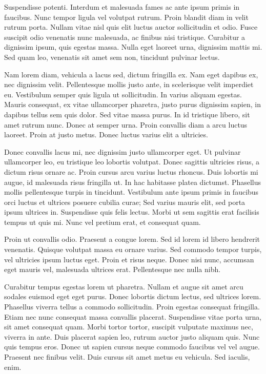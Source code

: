 \documentclass{article}
\begin{document}
Suspendisse potenti. Interdum et malesuada fames ac ante ipsum primis in faucibus. Nunc tempor ligula vel volutpat rutrum. Proin blandit diam in velit rutrum porta. Nullam vitae nisl quis elit luctus auctor sollicitudin et odio. Fusce suscipit odio venenatis nunc malesuada, ac finibus nisi tristique. Curabitur a dignissim ipsum, quis egestas massa. Nulla eget laoreet urna, dignissim mattis mi. Sed quam leo, venenatis sit amet sem non, tincidunt pulvinar lectus.

Nam lorem diam, vehicula a lacus sed, dictum fringilla ex. Nam eget dapibus ex, nec dignissim velit. Pellentesque mollis justo ante, in scelerisque velit imperdiet eu. Vestibulum semper quis ligula ut sollicitudin. In varius aliquam egestas. Mauris consequat, ex vitae ullamcorper pharetra, justo purus dignissim sapien, in dapibus tellus sem quis dolor. Sed vitae massa purus. In id tristique libero, sit amet rutrum nunc. Donec at semper urna. Proin convallis diam a arcu luctus laoreet. Proin at justo metus. Donec luctus varius elit a ultricies.

Donec convallis lacus mi, nec dignissim justo ullamcorper eget. Ut pulvinar ullamcorper leo, eu tristique leo lobortis volutpat. Donec sagittis ultricies risus, a dictum risus ornare ac. Proin cursus arcu varius luctus rhoncus. Duis lobortis mi augue, id malesuada risus fringilla ut. In hac habitasse platea dictumst. Phasellus mollis pellentesque turpis in tincidunt. Vestibulum ante ipsum primis in faucibus orci luctus et ultrices posuere cubilia curae; Sed varius mauris elit, sed porta ipsum ultrices in. Suspendisse quis felis lectus. Morbi ut sem sagittis erat facilisis tempus ut quis mi. Nunc vel pretium erat, et consequat quam.

Proin ut convallis odio. Praesent a congue lorem. Sed id lorem id libero hendrerit venenatis. Quisque volutpat massa eu ornare varius. Sed commodo tempor turpis, vel ultricies ipsum luctus eget. Proin et risus neque. Donec nisi nunc, accumsan eget mauris vel, malesuada ultrices erat. Pellentesque nec nulla nibh.

Curabitur tempus egestas lorem ut pharetra. Nullam et augue sit amet arcu sodales euismod eget eget purus. Donec lobortis dictum lectus, sed ultrices lorem. Phasellus viverra tellus a commodo sollicitudin. Proin egestas consequat fringilla. Etiam nec nunc consequat massa convallis placerat. Suspendisse vitae porta urna, sit amet consequat quam. Morbi tortor tortor, suscipit vulputate maximus nec, viverra in ante. Duis placerat sapien leo, rutrum auctor justo aliquam quis. Nunc quis tempus eros. Donec ut sapien cursus neque commodo faucibus vel vel augue. Praesent nec finibus velit. Duis cursus sit amet metus eu vehicula. Sed iaculis, enim. 


\end{document}
